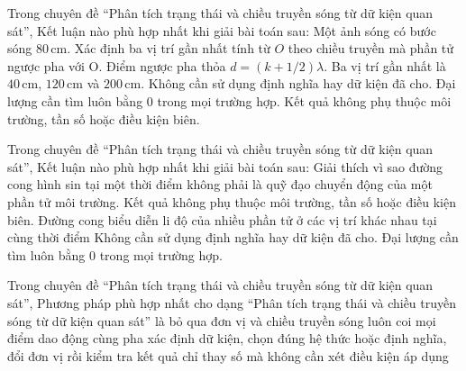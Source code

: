 \begin{ex}
Trong chuyên đề “Phân tích trạng thái và chiều truyền sóng từ dữ kiện quan sát”, Kết luận nào phù hợp nhất khi giải bài toán sau: Một ảnh sóng có bước sóng $80\,\text{cm}$. Xác định ba vị trí gần nhất tính từ $O$ theo chiều truyền mà phần tử ngược pha với O.
\choice
{\True Điểm ngược pha thỏa $d=(k+1/2)\lambda$. Ba vị trí gần nhất là $40\,\text{cm}$, $120\,\text{cm}$ và $200\,\text{cm}$.}
{Không cần sử dụng định nghĩa hay dữ kiện đã cho.}
{Đại lượng cần tìm luôn bằng 0 trong mọi trường hợp.}
{Kết quả không phụ thuộc môi trường, tần số hoặc điều kiện biên.}
\end{ex}

\begin{ex}
Trong chuyên đề “Phân tích trạng thái và chiều truyền sóng từ dữ kiện quan sát”, Kết luận nào phù hợp nhất khi giải bài toán sau: Giải thích vì sao đường cong hình sin tại một thời điểm không phải là quỹ đạo chuyển động của một phần tử môi trường.
\choice
{Kết quả không phụ thuộc môi trường, tần số hoặc điều kiện biên.}
{\True Đường cong biểu diễn li độ của nhiều phần tử ở các vị trí khác nhau tại cùng thời điểm}
{Không cần sử dụng định nghĩa hay dữ kiện đã cho.}
{Đại lượng cần tìm luôn bằng 0 trong mọi trường hợp.}
\end{ex}

\begin{ex}
Trong chuyên đề “Phân tích trạng thái và chiều truyền sóng từ dữ kiện quan sát”, Phương pháp phù hợp nhất cho dạng “Phân tích trạng thái và chiều truyền sóng từ dữ kiện quan sát” là
\choice
{bỏ qua đơn vị và chiều truyền sóng}
{luôn coi mọi điểm dao động cùng pha}
{\True xác định dữ kiện, chọn đúng hệ thức hoặc định nghĩa, đổi đơn vị rồi kiểm tra kết quả}
{chỉ thay số mà không cần xét điều kiện áp dụng}
\end{ex}

